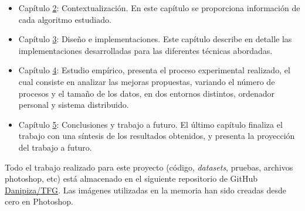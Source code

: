 	
	\begin{itemize}
		\item Capítulo \hyperref[cap:c2_context]{2}: Contextualización. En este capítulo se proporciona información de cada algoritmo estudiado.
		\item Capítulo \hyperref[cap:c3_implementaciones]{3}: Diseño e implementaciones. Este capítulo describe en detalle las implementaciones desarrolladas para las diferentes técnicas abordadas.
		\item Capítulo \hyperref[cap:c4_estudio]{4}: Estudio empírico, presenta el proceso experimental realizado, el cual consiste en analizar las mejoras propuestas, variando el número de procesos y el tamaño de los datos, en dos entornos distintos, ordenador personal y sistema distribuido.
		\item Capítulo \hyperref[cap:c5_conclu]{5}: Conclusiones y trabajo a futuro. El último capítulo finaliza el trabajo con una síntesis  de los resultados obtenidos, y presenta la proyección del trabajo a futuro.
	\end{itemize}
	
	Todo el trabajo realizado para este proyecto (código, \textit{datasets}, pruebas, archivos photoshop, etc) está almacenado en el siguiente repositorio de GitHub \href{https://github.com/Danipiza/TFG}{Danipiza/TFG}. Las imágenes utilizadas en la memoria han sido creadas desde cero en Photoshop.
	

















